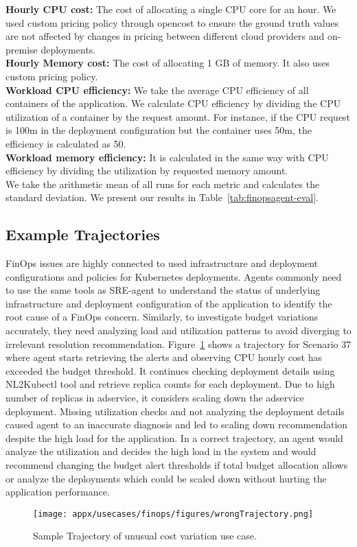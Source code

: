 \textbf{Hourly CPU cost:} The cost of allocating a single CPU core for an hour. We used custom pricing policy through opencost to ensure the ground truth values are not affected by changes in pricing between different cloud providers and on-premise deployments. \\

\textbf{Hourly Memory cost:} The cost of allocating 1 GB of memory. It also uses custom pricing policy. \\

\textbf{Workload CPU efficiency:} We take the average CPU efficiency of all containers of the application. We calculate CPU efficiency by dividing the CPU utilization of a container by the request amount. For instance, if the CPU request is 100m in the deployment configuration but the container uses 50m, the efficiency is calculated as 50.\\

\textbf{Workload memory efficiency:} It is calculated in the same way with CPU efficiency by dividing the utilization by requested memory amount. \\

We take the arithmetic mean of all runs for each metric and calculates the standard deviation. We present our results in Table~\ref{tab:finopsagent-eval}.



\subsection{Example Trajectories}
\label{ss:finops-trajectories}


FinOps issues are highly connected to used infrastructure and deployment configurations and policies for Kubernetes deployments. 
Agents commonly need to use the same tools as SRE-agent to understand the status of underlying infrastructure and deployment configuration of the application to identify the root cause of a FinOps concern. 
Similarly, to investigate budget variations accurately, they need analyzing load and utilization patterns to avoid diverging to irrelevant resolution recommendation. 
Figure~\ref{fig:finops-bad-trajectory} shows a trajectory for Scenario 37 where agent starts retrieving the alerts and observing CPU hourly cost has exceeded the budget threshold.
It continues checking deployment details using NL2Kubectl tool and retrieve replica counts for each deployment. 
Due to high number of replicas in adservice, it considers scaling down the adservice deployment. 
Missing utilization checks and not analyzing the deployment details caused agent to an inaccurate diagnosis and led to scaling down recommendation despite the high load for the application. 
In a correct trajectory, an agent would analyze the utilization and decides the high load in the system and would recommend changing the budget alert thresholds if total budget allocation allows or analyze the deployments which could be scaled down without hurting the application performance. 

\begin{figure}[hbtp]
    \centering
    \texttt{[image: appx/usecases/finops/figures/wrongTrajectory.png]}
    \caption{Sample Trajectory of unusual cost variation use case.} 
    \label{fig:finops-bad-trajectory}
\end{figure} 
